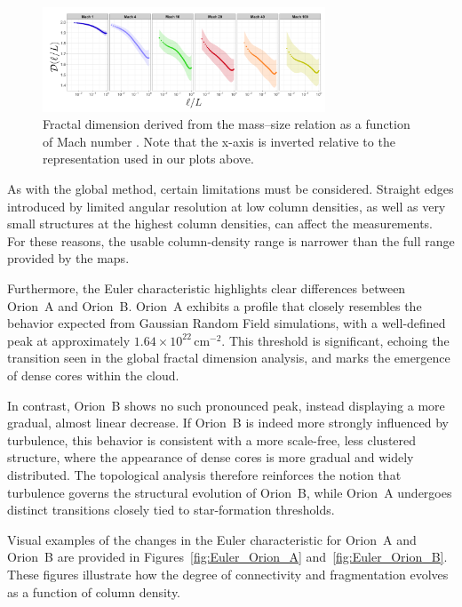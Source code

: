 \begin{figure}[t]
    \centering
    \includegraphics[width=0.75\textwidth]{figures/beattie_fractal_dimension.png}
    \caption{Fractal dimension derived from the mass–size relation as a function of Mach number \cite{beattie2019relation}.  
    Note that the x-axis is inverted relative to the representation used in our plots above.}
    \label{fig:beattie_fractal_dimension}
\end{figure}

As with the global method, certain limitations must be considered.  
Straight edges introduced by limited angular resolution at low column densities, as well as very small structures at the highest column densities, can affect the measurements.  
For these reasons, the usable column‑density range is narrower than the full range provided by the maps.

Furthermore, the Euler characteristic highlights clear differences between Orion~A and Orion~B.  
Orion~A exhibits a profile that closely resembles the behavior expected from Gaussian Random Field simulations, with a well-defined peak at approximately \(1.64 \times 10^{22}\,\mathrm{cm}^{-2}\).  
This threshold is significant, echoing the transition seen in the global fractal dimension analysis, and marks the emergence of dense cores within the cloud.

In contrast, Orion~B shows no such pronounced peak, instead displaying a more gradual, almost linear decrease.  
If Orion~B is indeed more strongly influenced by turbulence, this behavior is consistent with a more scale-free, less clustered structure, where the appearance of dense cores is more gradual and widely distributed.  
The topological analysis therefore reinforces the notion that turbulence governs the structural evolution of Orion~B, while Orion~A undergoes distinct transitions closely tied to star-formation thresholds.

Visual examples of the changes in the Euler characteristic for Orion~A and Orion~B are provided in Figures~\ref{fig:Euler_Orion_A} and~\ref{fig:Euler_Orion_B}.  
These figures illustrate how the degree of connectivity and fragmentation evolves as a function of column density.  

